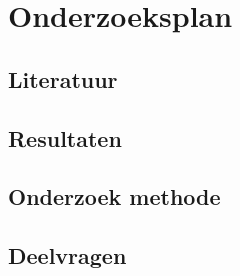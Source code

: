 \chapter{Onderzoeksplan}

\section{Literatuur} %

\section{Resultaten} %

\section{Onderzoek methode} %

\section{Deelvragen} %


